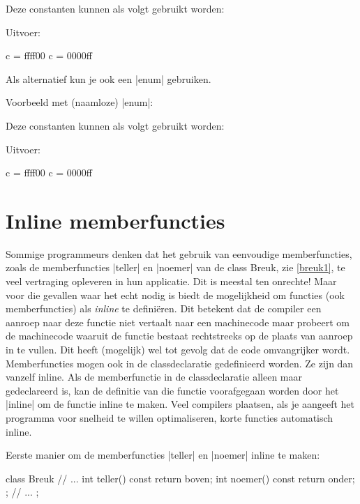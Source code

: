 \begin{cpplstShortInline}
Deze constanten kunnen als volgt gebruikt worden:

Uitvoer:
\begin{coutput}
c = ffff00
c = 0000ff
\end{coutput}

Als alternatief kun je ook een |enum| gebruiken.

Voorbeeld met  (naamloze) |enum|:

Deze constanten kunnen als volgt gebruikt worden:

Uitvoer:
\begin{coutput}
c = ffff00
c = 0000ff
\end{coutput}

\section{Inline memberfuncties}
\label{inline}
Sommige programmeurs denken dat het gebruik van eenvoudige memberfuncties, zoals de memberfuncties |teller| en |noemer| van de class Breuk, zie \cref{breuk1}, te veel vertraging opleveren in hun applicatie.
Dit is meestal ten onrechte!
Maar voor die gevallen waar het echt nodig is biedt \Cpp{} de mogelijkheid om functies (ook memberfuncties) als \emph{inline} te definiëren.
Dit betekent dat de compiler een aanroep naar deze functie niet vertaalt naar een  machinecode maar probeert om de machinecode waaruit de functie bestaat rechtstreeks op de plaats van aanroep in te vullen.
Dit heeft (mogelijk) wel tot gevolg dat de code omvangrijker wordt.
Memberfuncties mogen ook in de classdeclaratie gedefinieerd worden.
Ze zijn dan vanzelf inline.
Als de memberfunctie in de classdeclaratie alleen maar gedeclareerd is, kan de definitie van die functie voorafgegaan worden door het  |inline| om de functie inline te maken.
Veel compilers plaatsen, als je aangeeft het programma voor snelheid te willen optimaliseren, korte functies automatisch inline.

Eerste manier om de memberfuncties |teller| en |noemer| inline te maken:
\begin{cpplstfragment}
class Breuk {
//  ...
    int teller() const {
        return boven;
    }
    int noemer() const  {
        return onder;
    };
//  ...
};
\end{cpplstfragment}


\end{cpplstShortInline}

